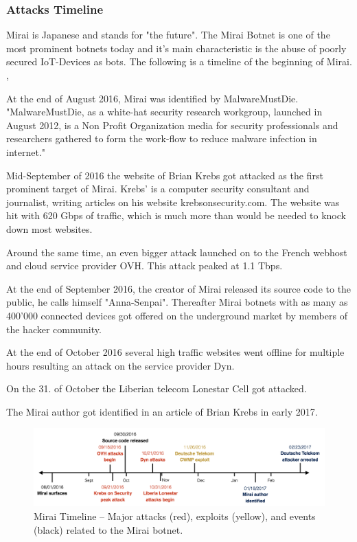 	\subsubsection{Attacks Timeline}
	Mirai is Japanese and stands for "the future". The Mirai Botnet is one of the most prominent botnets today and it's main characteristic is the abuse of poorly secured IoT-Devices as bots. The following is a timeline of the beginning of Mirai. \cite{Kolias17}, \cite{Antonakakis17}
	
	At the end of August 2016, Mirai was identified by MalwareMustDie. "MalwareMustDie, as a white-hat security research workgroup, launched in August 2012, is a Non Profit Organization media for security professionals and researchers gathered to form the work-flow to reduce malware infection in internet." \cite{MalwareMustDie}
	
	Mid-September of 2016 the website of Brian Krebs got attacked as the first prominent target of Mirai. Krebs' is a computer security consultant and journalist, writing articles on his website krebsonsecurity.com. The website was hit with 620 Gbps of traffic, which is much more than would be needed to knock down most websites. \cite{Krebs16_2}
	
	Around the same time, an even bigger attack launched on to the French webhost and cloud service provider OVH. This attack peaked at 1.1 Tbps.
	
	At the end of September 2016, the creator of Mirai released its source code to the public, he calls himself "Anna-Senpai". Thereafter Mirai botnets with as many as 400'000 connected devices got offered on the underground market by members of the hacker community.
	
	At the end of October 2016 several high traffic websites went offline for multiple hours resulting an attack on the service provider Dyn.
	
	On the 31. of October the Liberian telecom Lonestar Cell got attacked.
	
	The Mirai author got identified in an article of Brian Krebs in early 2017. \cite{Krebs17}

\begin{figure}[ht]
\begin{center} \includegraphics[scale=0.35]{Talk11/mirai-timeline} \end{center}
\caption{Mirai Timeline -- Major attacks (red), exploits (yellow), and events (black) related to the Mirai botnet. \cite{Antonakakis17}}
\label{fig:timeline}
\end{figure}

